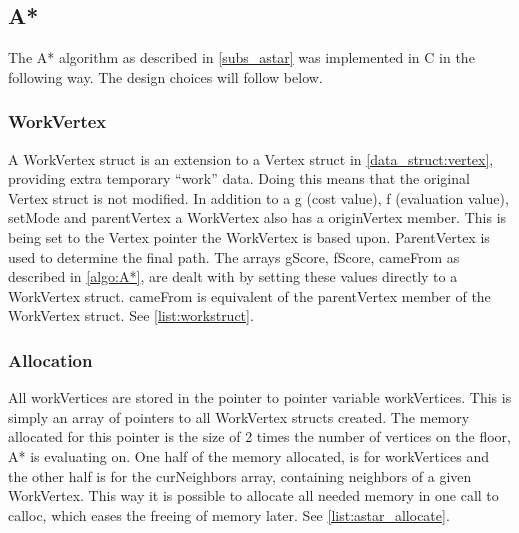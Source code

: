 \subsection{A*}

The A* algorithm as described in \cref{subs_astar} was implemented in C in the following way. The design choices will follow below.

\subsubsection{WorkVertex}



A WorkVertex struct is an extension to a Vertex struct in \cref{data_struct:vertex}, providing extra temporary \enquote{work} data. Doing this means that the original Vertex struct is not modified. In addition to a g (cost value), f (evaluation value), setMode and parentVertex a WorkVertex also has a originVertex member. This is being set to the Vertex pointer the WorkVertex is based upon. ParentVertex is used to determine the final path. The arrays gScore, fScore, cameFrom as described in \cref{algo:A*}, are dealt with by setting these values directly to a WorkVertex struct. cameFrom is equivalent of the parentVertex member of the WorkVertex struct. See \cref{list:workstruct}.

\subsubsection{Allocation}



All workVertices are stored in the pointer to pointer variable workVertices. This is simply an array of pointers to all WorkVertex structs created. The memory allocated for this pointer is the size of 2 times the number of vertices on the floor, A* is evaluating on. One half of the memory allocated, is for workVertices and the other half is for the curNeighbors array, containing neighbors of a given WorkVertex.  This way it is possible to allocate all needed memory in one call to calloc, which eases the freeing of memory later. See \cref{list:astar_allocate}.



